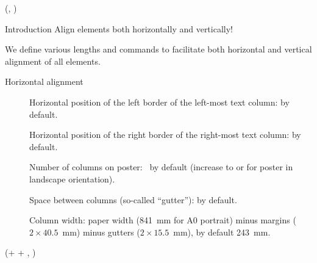 \documentclass{beamer}
\newlength{\blockThree}
\begin{document}
\begin{frame}[t]





\TPshowboxesfalse

\begin{textblock*}{\colwidth}(\leftmargin, \blockThree)

\begin{parblock}{Introduction}
	\alert{Align elements both horizontally and vertically!}

	\vspace{0.333333\baselineskip}
	\noindent We define various lengths and commands to facilitate both horizontal and vertical alignment of all elements.

	\vspace{0.666667\baselineskip}
	\noindent\alert{Horizontal alignment}

	\begin{description}
		\item[] Horizontal position of the left border of the left-most text column: \code{40.5mm} by default.
		\item[] Horizontal position of the right border of the right-most text column: \code{40.5mm} by default.
		\item[] Number of columns on poster: ~by default (increase to  or  for poster in landscape orientation).
		\item[] Space between columns (so-called ``gutter''): \code{15.5mm} by default.
		\item[] Column width: paper width (841~mm for A0 portrait) minus margins (${2 \times 40.5}$~mm) minus gutters (${2 \times 15.5}$~mm), by default 243~mm.
	\end{description}
\end{parblock}

\end{textblock*}




\begin{textblock*}{\colwidth}(\leftmargin + \colwidth + \colsep, \blockThree)


\end{textblock*}
\end{frame}
\end{document}
